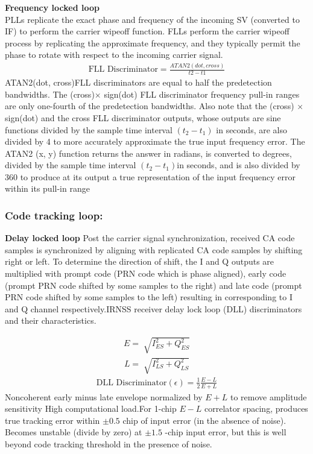 \textbf{Frequency locked loop}\\
PLLs replicate the exact phase and frequency of the incoming SV (converted to IF) to perform the carrier wipeoff function. FLLs perform the carrier wipeoff process by replicating the approximate frequency, and they typically permit the phase to rotate with respect to the incoming carrier signal.
\begin{align}
\text{FLL Discriminator} =\frac{ATAN2(dot,cross)}{t2-t1}
\end{align}
ATAN2(dot, cross)FLL discriminators are equal to half the predetection bandwidths. The (cross)$\times$ sign(dot) FLL discriminator frequency pull-in ranges are only one-fourth of the predetection bandwidths. Also note that the (cross) $\times$ sign(dot) and the cross FLL discriminator outputs, whose outputs are sine functions divided by the sample time interval $(t_2 -t _1)$ in seconds, are also divided by 4 to more accurately approximate the true input frequency error. The ATAN2 (x, y) function returns the answer in radians, is converted to degrees, divided by the sample time interval $(t_2 - t_1)$in seconds,
and is also divided by 360 to produce at its output a true representation of the input
frequency error within its pull-in range
\subsubsection{Code tracking loop:}
\textbf{Delay locked loop}
Post the carrier signal synchronization, received CA code samples is synchronized by aligning with replicated CA code samples by shifting right or left. To determine the direction of shift, the I and Q outputs are multiplied with prompt code (PRN code which is phase aligned), early code (prompt PRN code shifted by some samples to the right) and late code (prompt PRN code shifted by some samples to the left) resulting in corresponding to I and Q channel respectively.IRNSS receiver delay lock loop (DLL) discriminators and their characteristics.

 \begin{align}
 E=\sqrt[]{I_{ES}^2+Q_{ES}^2}
 \end{align}
 \begin{align}
 L=\sqrt[]{I_{LS}^2+Q_{LS}^2}
 \end{align}
\begin{align}
\text{DLL Discriminator} (\epsilon)=\frac{1}{2}\frac{E-L}{E+L}
\end{align}
Noncoherent early minus late envelope normalized by $E + L$ to remove amplitude sensitivity High computational load.For  1-chip $E - L$ correlator spacing, produces true tracking error within $\pm 0.5$  chip of input error (in the absence of noise).
Becomes unstable (divide by zero) at $\pm 1.5$ -chip input error, but this is well beyond code tracking threshold in the presence of noise.
